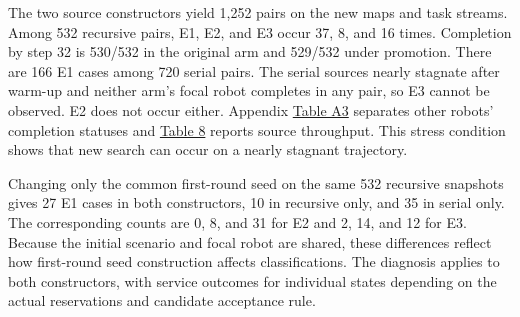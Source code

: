 \documentclass{article}
\begin{document}
The two source constructors yield 1,252 pairs on the new maps and task streams. Among 532 recursive pairs, E1, E2, and E3 occur 37, 8, and 16 times. Completion by step 32 is 530/532 in the original arm and 529/532 under promotion. There are 166 E1 cases among 720 serial pairs. The serial sources nearly stagnate after warm-up and neither arm's focal robot completes in any pair, so E3 cannot be observed. E2 does not occur either. Appendix \hyperlink{display:TableA3}{Table A3} separates other robots' completion statuses and \hyperlink{display:Table8}{Table 8} reports source throughput. This stress condition shows that new search can occur on a nearly stagnant trajectory.

Changing only the common first-round seed on the same 532 recursive snapshots gives 27 E1 cases in both constructors, 10 in recursive only, and 35 in serial only. The corresponding counts are 0, 8, and 31 for E2 and 2, 14, and 12 for E3. Because the initial scenario and focal robot are shared, these differences reflect how first-round seed construction affects classifications. The diagnosis applies to both constructors, with service outcomes for individual states depending on the actual reservations and candidate acceptance rule.
\end{document}
